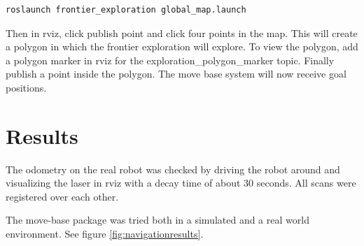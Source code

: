 \documentclass[a4paper]{article}
\begin{document}
\begin{lstlisting}[language=bash,caption={commands to determine robot limitations},
    label=lst:robotlimits]
roslaunch frontier_exploration global_map.launch
\end{lstlisting}

Then in rviz, click publish point and click four points in the map. This will create
a polygon in which the frontier exploration will explore. To view the polygon,
add a polygon marker in rviz for the exploration\_polygon\_marker topic.
Finally publish a point inside the polygon. The move base system will now receive
goal positions.


\section{Results}

The odometry on the real robot was checked by driving the robot around and visualizing the
laser in rviz with a decay time of about 30 seconds. All scans were registered over
each other.

The move-base package was tried both in a simulated and a real world environment.
See figure \ref{fig:navigationresults}.
\end{document}
